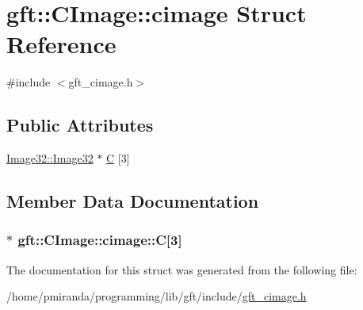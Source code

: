 \hypertarget{structgft_1_1CImage_1_1cimage}{}\section{gft\+:\+:C\+Image\+:\+:cimage Struct Reference}
\label{structgft_1_1CImage_1_1cimage}


{\ttfamily \#include $<$gft\+\_\+cimage.\+h$>$}

\subsection*{Public Attributes}
\begin{DoxyCompactItemize}
\item 
\hyperlink{namespacegft_1_1Image32_a6c5a03566b593bb406f1fe33266a0382}{Image32\+::\+Image32} $\ast$ \hyperlink{structgft_1_1CImage_1_1cimage_a01068881b258a498dee3c449dd58c174}{C} \mbox{[}3\mbox{]}
\end{DoxyCompactItemize}


\subsection{Member Data Documentation}
\subsubsection[{\texorpdfstring{C}{C}}]{$\ast$ gft\+::\+C\+Image\+::cimage\+::C\mbox{[}3\mbox{]}}\hypertarget{structgft_1_1CImage_1_1cimage_a01068881b258a498dee3c449dd58c174}{}\label{structgft_1_1CImage_1_1cimage_a01068881b258a498dee3c449dd58c174}


The documentation for this struct was generated from the following file\+:\begin{DoxyCompactItemize}
\item 
/home/pmiranda/programming/lib/gft/include/\hyperlink{gft__cimage_8h}{gft\+\_\+cimage.\+h}\end{DoxyCompactItemize}
